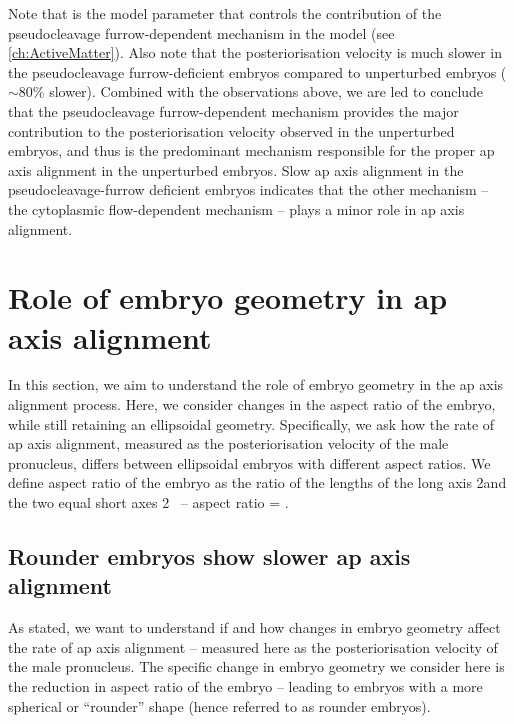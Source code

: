 Note that \nematicLength is the model parameter that controls the contribution of the pseudocleavage furrow-dependent mechanism in the model (see \autoref{ch:ActiveMatter}). Also note that the posteriorisation velocity is much slower in the pseudocleavage furrow-deficient embryos compared to unperturbed embryos ($\sim$\num{80}\% slower). Combined with the observations above, we are led to conclude that the pseudocleavage furrow-dependent mechanism provides the major contribution to the posteriorisation velocity observed in the unperturbed embryos, and thus is the predominant mechanism responsible for the proper \ac{ap} axis alignment in the unperturbed embryos. Slow \ac{ap} axis alignment in the pseudocleavage-furrow deficient embryos indicates that the other mechanism -- the cytoplasmic flow-dependent mechanism -- plays a minor role in \ac{ap} axis alignment.


\section{Role of embryo geometry in \acs{ap} axis alignment}\label{sec:GeometryRole}
In this section, we aim to understand the role of embryo geometry in the \ac{ap} axis alignment process. Here, we consider changes in the aspect ratio of the embryo, while still retaining an ellipsoidal geometry. Specifically, we ask how the rate of \ac{ap} axis alignment, measured as the posteriorisation velocity of the male pronucleus, differs between ellipsoidal embryos with different aspect ratios. We define aspect ratio of the embryo as the ratio of the lengths of the long axis 2\longAxisLength and the two equal short axes 2\shortAxisLength~ -- aspect ratio = \aspectRatio. 

\subsection{Rounder embryos show slower \acs{ap} axis alignment}\label{subsec:roundEmbryosIma3}
As stated, we want to understand if and how changes in embryo geometry affect the rate of \ac{ap} axis alignment -- measured here as the posteriorisation velocity of the male pronucleus. The specific change in embryo geometry we consider here is the reduction in aspect ratio of the embryo -- leading to embryos with a more spherical or \enquote{rounder} shape (hence referred to as rounder embryos). 

